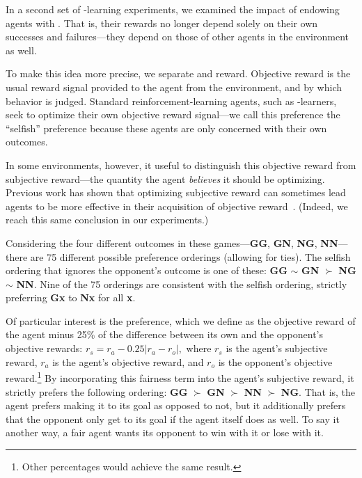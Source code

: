 
In a second set of \Q-learning experiments, we examined the impact of
endowing agents with . That is, their
rewards no longer depend solely on their own successes and
failures---they depend on those of other agents in the environment as
well.

To make this idea more precise, we separate  and
 reward. Objective reward is the usual reward
signal provided to the agent from the environment, and by which
behavior is judged. Standard reinforcement-learning agents, such
as \Q-learners, seek to optimize their own objective reward
signal---we call this preference the ``selfish'' preference because
these agents are only concerned with their own outcomes.

In some environments, however, it useful to distinguish this objective
reward from subjective reward---the quantity the agent \emph{believes}
it should be optimizing. Previous work has shown that optimizing
subjective reward can sometimes lead agents to be more effective in
their acquisition of objective reward~\cite{singh2009rewards}.  (Indeed, we
reach this same conclusion in our experiments.)

Considering the four different outcomes in these games---{\bf GG},
{\bf GN}, {\bf NG}, {\bf NN}---there are 75 different possible
preference orderings (allowing for ties). The selfish ordering that
ignores the opponent's outcome is one of these:
{\bf GG} $\sim$ {\bf GN} $\succ$ {\bf NG} $\sim$ {\bf NN}.
Nine of the 75 orderings are consistent with the selfish ordering,
strictly preferring {\bf Gx} to {\bf Nx} for all {\bf x}.

Of particular interest is the  preference, which we define
as the objective reward of the agent minus 25\% of the difference
between its own and the opponent's objective rewards:
$r_{s} = r_{a} - 0.25 \left| r_{a} - r_{o} \right|,$ where $r_{s}$
is the agent's subjective reward, $r_{a}$ is the agent's objective
reward, and $r_{o}$ is the opponent's objective reward.\footnote{Other
percentages would achieve the same result.}  By incorporating this
fairness term into the agent's subjective reward, it strictly prefers
the following ordering:
{\bf GG} $\succ$ \mbox{\bf GN} $\succ$ \mbox {\bf NN} $\succ$ {\bf NG}.
That is, the agent prefers making it to its goal as opposed to not,
but it additionally prefers that the opponent only get to its goal if
the agent itself does as well. To say it another way, a fair agent
wants its opponent to win with it or lose with it.

